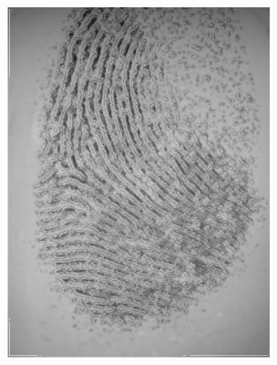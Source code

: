 \documentclass{beamer}
\begin{document}
{\begin{figure}[!ht]
\begin{subfigure}[ht]{0.15\textwidth}
            \includegraphics[width=\textwidth]{fingerprints/2004Db4a/1_3_background.jpg}
        \end{subfigure}
        \qquad
        \begin{subfigure}[ht]{0.15\textwidth}

\end{subfigure}
\end{figure}}
\end{document}
